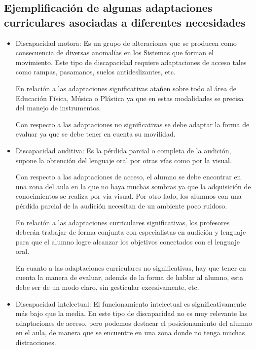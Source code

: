 \subsection{Ejemplificación de algunas adaptaciones curriculares asociadas a diferentes necesidades }

\begin{itemize}
    \item Discapacidad motora: Es un grupo de alteraciones que se producen como consecuencia de diversas anomalías en los Sistemas que forman el movimiento. Este tipo de discapacidad requiere  adaptaciones de acceso tales como rampas, pasamanos, suelos antideslizantes, etc. 
    
    En relación a las adaptaciones significativas atañen sobre todo al área de Educación Física, Música o Plástica ya que en estas modalidades se precisa del manejo de instrumentos. 

    Con respecto a las adaptaciones no significativas se debe adaptar la forma de evaluar ya que se debe tener en cuenta su movilidad. 
    
    \item Discapacidad auditiva: Es la pérdida parcial o completa de la audición, supone la obtención del lenguaje oral por otras vías como por la visual. 
    
    Con respecto a las adaptaciones de acceso, el alumno se debe encontrar en una zona del aula en la que no haya muchas sombras ya que la adquisición de conocimientos se realiza por vía visual. Por otro lado, los alumnos con una pérdida parcial de la audición necesitan de un ambiente poco ruidoso. 
    
    En relación a las adaptaciones curriculares significativas, los profesores deberán trabajar de forma conjunta con especialistas en audición y lenguaje para que el alumno logre alcanzar los objetivos conectados con el lenguaje oral.

    En cuanto a las adaptaciones curriculares no significativas, hay que tener en cuenta la manera de evaluar, además de la forma de hablar al alumno, esta debe ser de un modo claro, sin gesticular excesivamente, etc.
    
    \item Discapacidad intelectual: El funcionamiento intelectual es significativamente más bajo que la media. En este tipo de discapacidad no es muy relevante las adaptaciones de acceso, pero podemos destacar el posicionamiento del alumno en el aula, de manera que se encuentre en una zona donde no tenga muchas distracciones.
    

\end{itemize}
